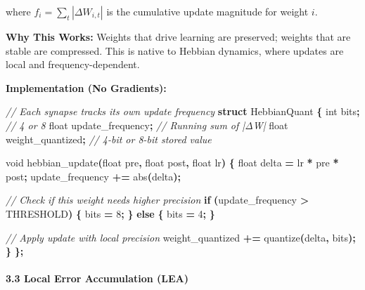\documentclass[
  11pt,
  a4paper,
]{article}
\newenvironment{Shaded}{\begin{snugshade}}{\end{snugshade}}
\newcommand{\CommentTok}[1]{\textcolor[rgb]{0.56,0.35,0.01}{\textit{#1}}}
\newcommand{\ControlFlowTok}[1]{\textcolor[rgb]{0.13,0.29,0.53}{\textbf{#1}}}
\newcommand{\DataTypeTok}[1]{\textcolor[rgb]{0.13,0.29,0.53}{#1}}
\newcommand{\DecValTok}[1]{\textcolor[rgb]{0.00,0.00,0.81}{#1}}
\newcommand{\KeywordTok}[1]{\textcolor[rgb]{0.13,0.29,0.53}{\textbf{#1}}}
\newcommand{\NormalTok}[1]{#1}
\newcommand{\OperatorTok}[1]{\textcolor[rgb]{0.81,0.36,0.00}{\textbf{#1}}}
\begin{document}
where \(f_i = \sum_{t} |\Delta W_{i,t}|\) is the cumulative update
magnitude for weight \(i\).

\textbf{Why This Works:} Weights that drive learning are preserved;
weights that are stable are compressed. This is native to Hebbian
dynamics, where updates are local and frequency-dependent.

\textbf{Implementation (No Gradients):}

\begin{Shaded}
\begin{Highlighting}[]
\CommentTok{// Each synapse tracks its own update frequency}
\KeywordTok{struct}\NormalTok{ HebbianQuant }\OperatorTok{\{}
    \DataTypeTok{int}\NormalTok{ bits}\OperatorTok{;}                  \CommentTok{// 4 or 8}
    \DataTypeTok{float}\NormalTok{ update\_frequency}\OperatorTok{;}    \CommentTok{// Running sum of |ΔW|}
    \DataTypeTok{float}\NormalTok{ weight\_quantized}\OperatorTok{;}    \CommentTok{// 4{-}bit or 8{-}bit stored value}
    
    \DataTypeTok{void}\NormalTok{ hebbian\_update}\OperatorTok{(}\DataTypeTok{float}\NormalTok{ pre}\OperatorTok{,} \DataTypeTok{float}\NormalTok{ post}\OperatorTok{,} \DataTypeTok{float}\NormalTok{ lr}\OperatorTok{)} \OperatorTok{\{}
        \DataTypeTok{float}\NormalTok{ delta }\OperatorTok{=}\NormalTok{ lr }\OperatorTok{*}\NormalTok{ pre }\OperatorTok{*}\NormalTok{ post}\OperatorTok{;}
\NormalTok{        update\_frequency }\OperatorTok{+=}\NormalTok{ abs}\OperatorTok{(}\NormalTok{delta}\OperatorTok{);}
        
        \CommentTok{// Check if this weight needs higher precision}
        \ControlFlowTok{if} \OperatorTok{(}\NormalTok{update\_frequency }\OperatorTok{\textgreater{}}\NormalTok{ THRESHOLD}\OperatorTok{)} \OperatorTok{\{}
\NormalTok{            bits }\OperatorTok{=} \DecValTok{8}\OperatorTok{;}
        \OperatorTok{\}} \ControlFlowTok{else} \OperatorTok{\{}
\NormalTok{            bits }\OperatorTok{=} \DecValTok{4}\OperatorTok{;}
        \OperatorTok{\}}
        
        \CommentTok{// Apply update with local precision}
\NormalTok{        weight\_quantized }\OperatorTok{+=}\NormalTok{ quantize}\OperatorTok{(}\NormalTok{delta}\OperatorTok{,}\NormalTok{ bits}\OperatorTok{);}
    \OperatorTok{\}}
\OperatorTok{\};}
\end{Highlighting}
\end{Shaded}

\paragraph{3.3 Local Error Accumulation
(LEA)}\label{local-error-accumulation-lea}
\end{document}
